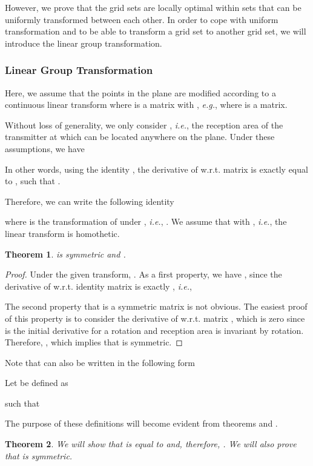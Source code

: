 \documentclass[12pt,english]{article}
\newtheorem{theorem}{Theorem}[section]
\begin{document}
However, we prove that the grid sets are locally optimal within sets that can be uniformly transformed between each other. In order to cope with uniform transformation and to be able to transform a grid set to another grid set, we will introduce the linear group transformation. 

\subsubsection{Linear Group Transformation}

Here, we assume that the points in the plane are modified according to a continuous linear transform  where  is a matrix with \mbox{}, {\it e.g.}, \mbox{} where  is a matrix. 

Without loss of generality, we only consider , {\it i.e.}, the reception area of the transmitter at  which can be located anywhere on the plane. Under these assumptions, we have


In other words, using the identity \mbox{}, the derivative of  w.r.t. matrix  is exactly equal to \mbox{}, 
such that
. 

Therefore, we can write the following identity

where  is the transformation of  under , {\it i.e.}, \mbox{}. We assume that {} with \mbox{}, {\it i.e.}, the linear transform is homothetic.


\begin{theorem}
 is symmetric and .
\end{theorem}

\begin{proof}
Under the given transform, . As a first property, we have \mbox{}, since the derivative of  w.r.t. identity matrix  is exactly , {\it i.e.}, 
 
The second property that  is a symmetric matrix is not obvious. The easiest proof of this property is to consider the derivative of  w.r.t. matrix \mbox{},
which is zero since  is the initial derivative for a rotation and reception area is invariant by rotation. 
Therefore, \mbox{}, which implies that  is symmetric. 
\end{proof}

Note that  can also be written in the following form

Let  be defined as

such that

The purpose of these definitions will become evident from theorems  and .

\begin{theorem}
We will show that  is equal to  and, therefore, . We will also prove that  is symmetric. 
\end{theorem}
\end{document}

